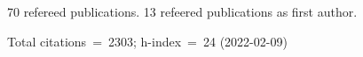 70 refereed publications. 13 refeered publications as first author.

Total citations~=~2303; h-index~=~24 (2022-02-09)